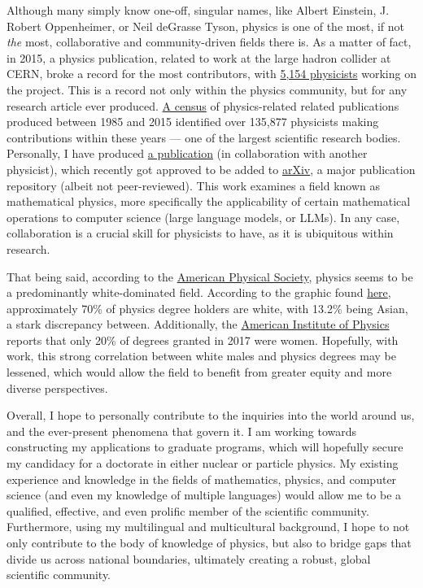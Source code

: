 \begin{justify}
  \hspace{.5in} Although many simply know one-off, singular names, like Albert Einstein, J. Robert Oppenheimer, or Neil deGrasse Tyson, physics is one of the most, if not \textit{the} most, collaborative and community-driven fields there is. As a matter of fact, in 2015, a physics publication, related to work at the large hadron collider at CERN, broke a record for the most contributors, with \href{https://www.nature.com/articles/nature.2015.17567}{5,154 physicists} working on the project. This is a record not only within the physics community, but for any research article ever produced. \href{https://arxiv.org/pdf/1901.02789}{A census} of physics-related related publications produced between 1985 and 2015 identified over 135,877 physicists making contributions within these years — one of the largest scientific research bodies. Personally, I have produced \href{https://arxiv.org/abs/2405.01727}{a publication} (in collaboration with another physicist), which recently got approved to be added to \href{https://arxiv.org/}{arXiv}, a major publication repository (albeit not peer-reviewed). This work examines a field known as mathematical physics, more specifically the applicability of certain mathematical operations to computer science (large language models, or LLMs). In any case, collaboration is a crucial skill for physicists to have, as it is ubiquitous within research.

  \hspace{.5in} That being said, according to the \href{https://www.aps.org/}{American Physical Society}, physics seems to be a predominantly white-dominated field. According to the graphic found \href{https://www.aps.org/programs/education/statistics/degreesbyrace.cfm}{here}, approximately 70\% of physics degree holders are white, with 13.2\% being Asian, a stark discrepancy between. Additionally, the \href{https://www.aip.org/}{American Institute of Physics} reports that only 20\% of degrees granted in 2017 were women. Hopefully, with work, this strong correlation between white males and physics degrees may be lessened, which would allow the field to benefit from greater equity and more diverse perspectives.

  \hspace{.5in} Overall, I hope to personally contribute to the inquiries into the world around us, and the ever-present phenomena that govern it. I am working towards constructing my applications to graduate programs, which will hopefully secure my candidacy for a doctorate in either nuclear or particle physics. My existing experience and knowledge in the fields of mathematics, physics, and computer science (and even my knowledge of multiple languages) would allow me to be a qualified, effective, and even prolific member of the scientific community. Furthermore, using my multilingual and multicultural background, I hope to not only contribute to the body of knowledge of physics, but also to bridge gaps that divide us across national boundaries, ultimately creating a robust, global scientific community.

\end{justify} 



